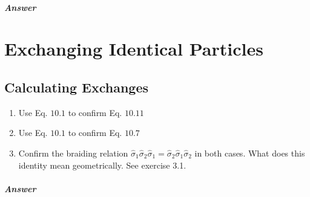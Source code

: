 \documentclass{book}
\begin{document}
\paragraph{Answer}


\chapter{Exchanging Identical Particles}
\section{Calculating Exchanges}

\begin{enumerate}
\item Use Eq. $10.1$ to confirm Eq. $10.11$
\item Use Eq. $10.1$ to confirm Eq. $10.7$
\item Confirm the braiding relation $\hat{\sigma }_{1}\hat{\sigma }_{2}\hat{\sigma }_{1} =\hat{\sigma }_{2}\hat{\sigma }_{1}\hat{\sigma }_{2}$ in both cases. What does this identity mean geometrically. See exercise 3.1.
\end{enumerate}

\paragraph{Answer}
\end{document}
